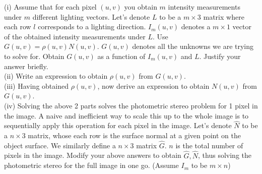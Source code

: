 \documentclass[answers]{exam}
\begin{document}
(i) Assume that for each pixel $(u,v)$ you obtain $m$ intensity measurements under $m$ different lighting vectors. Let's denote $L$ to be a $m \times 3$ matrix where each row $l$ corresponds to a lighting direction. $I_{m}(u,v)$ denotes a $m \times 1$ vector of the obtained intensity measurements under $L$. Use $G(u,v) = \rho(u,v) N(u,v)$. $G(u,v)$ denotes all the unknowns we are trying to solve for. Obtain $G(u,v)$ as a function of $I_{m}(u,v)$ and $L$. Justify your answer briefly. \\
(ii) Write an expression to obtain $\rho(u,v)$ from $G(u,v)$. \\
(iii) Having obtained $\rho(u,v)$, now derive an expression to obtain $N(u,v)$ from $G(u,v)$. \\  
(iv) Solving the above 2 parts solves the photometric stereo problem for 1 pixel in the image. A naive and inefficient way to scale this up to the whole image is to sequentially apply this operation for each pixel in the image. Let's denote $\hat{N}$ to be a $n \times 3$ matrix, whose each row is the surface normal at a given point on the object surface. We similarly define a $n \times 3$ matrix $\hat{G}$. $n$ is the total number of pixels in the image. Modify your above answers to obtain $\hat{G}, \hat{N}$, thus solving the photometric stereo for the full image in one go. (Assume $I_m$ to be $m \times n$)
\end{document}
